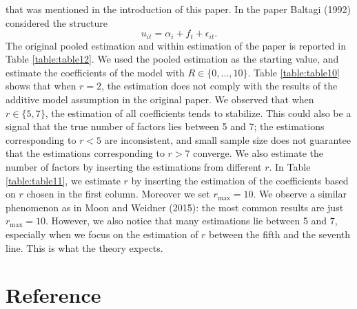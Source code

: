 \documentclass[a4paper]{article}
\begin{document}
that was mentioned in the introduction of this paper. In the paper Baltagi (1992) considered the structure
\[
    u_{it}=\alpha_i+f_t+\epsilon_{it}.
\]
 The original pooled estimation and within estimation of the paper is reported in Table \ref{table:table12}. We used the pooled estimation as the starting value, and estimate the coefficients of the model with $R \in \{0,\ldots, 10\}$. Table \ref{table:table10} shows that when $r=2$, the estimation does not comply with the results of the additive model assumption in the original paper. We observed that when $r \in \{5,7\}$, the estimation of all coefficients tends to stabilize. This could also be a signal that the true number of factors lies between 5 and 7; the estimations corresponding to $r<5$ are inconsistent, and small sample size does not guarantee that the estimations corresponding to $r>7$ converge. We also estimate the number of factors by inserting the estimations from different $r$. In Table \ref{table:table11}, we estimate $r$ by inserting the estimation of the coefficients based on $r$ chosen in the first column. Moreover we set $r_{\text{max}}=10$. We observe a similar phenomenon as in Moon and Weidner (2015): the most common results are just $r_{\text{max}}=10$. However, we also notice that many estimations lie between 5 and 7, especially when we focus on the estimation of $r$ between the fifth and the seventh line. This is what the theory expects.





\clearpage
\section*{Reference}
\end{document}
